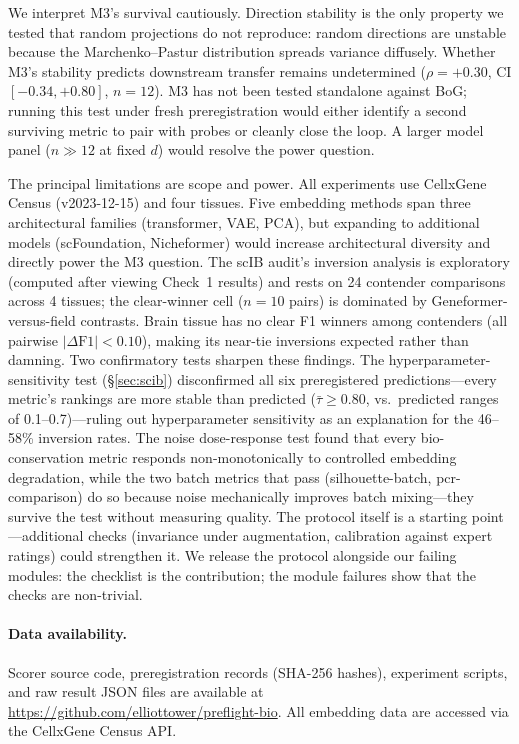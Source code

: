 \documentclass[10pt,letterpaper]{article}
\begin{document}
We interpret M3's survival cautiously. Direction stability is the only property we tested that random projections do not reproduce: random directions are unstable because the Marchenko--Pastur distribution spreads variance diffusely. Whether M3's stability predicts downstream transfer remains undetermined ($\rho = +0.30$, CI $[-0.34, +0.80]$, $n = 12$). M3 has not been tested standalone against BoG; running this test under fresh preregistration would either identify a second surviving metric to pair with probes or cleanly close the loop. A larger model panel ($n \gg 12$ at fixed $d$) would resolve the power question.

The principal limitations are scope and power. All experiments use CellxGene Census (v2023-12-15) and four tissues. Five embedding methods span three architectural families (transformer, VAE, PCA), but expanding to additional models (scFoundation, Nicheformer) would increase architectural diversity and directly power the M3 question. The scIB audit's inversion analysis is exploratory (computed after viewing Check~1 results) and rests on 24 contender comparisons across 4 tissues; the clear-winner cell ($n = 10$ pairs) is dominated by Geneformer-versus-field contrasts. Brain tissue has no clear F1 winners among contenders (all pairwise $|\Delta\text{F1}| < 0.10$), making its near-tie inversions expected rather than damning. Two confirmatory tests sharpen these findings. The hyperparameter-sensitivity test (\S\ref{sec:scib}) disconfirmed all six preregistered predictions---every metric's rankings are more stable than predicted ($\bar{\tau} \geq 0.80$, vs.\ predicted ranges of 0.1--0.7)---ruling out hyperparameter sensitivity as an explanation for the 46--58\% inversion rates. The noise dose-response test found that every bio-conservation metric responds non-monotonically to controlled embedding degradation, while the two batch metrics that pass (silhouette-batch, pcr-comparison) do so because noise mechanically improves batch mixing---they survive the test without measuring quality. The protocol itself is a starting point---additional checks (invariance under augmentation, calibration against expert ratings) could strengthen it. We release the protocol alongside our failing modules: the checklist is the contribution; the module failures show that the checks are non-trivial.

\paragraph{Data availability.} Scorer source code, preregistration records (SHA-256 hashes), experiment scripts, and raw result JSON files are available at \url{https://github.com/elliottower/preflight-bio}. All embedding data are accessed via the CellxGene Census API.
\end{document}
